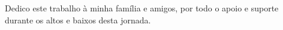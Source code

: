 
\begin{dedicatoria}%

    Dedico este trabalho à minha família e amigos, por todo o apoio e suporte durante os altos e baixos desta jornada.

\end{dedicatoria}
